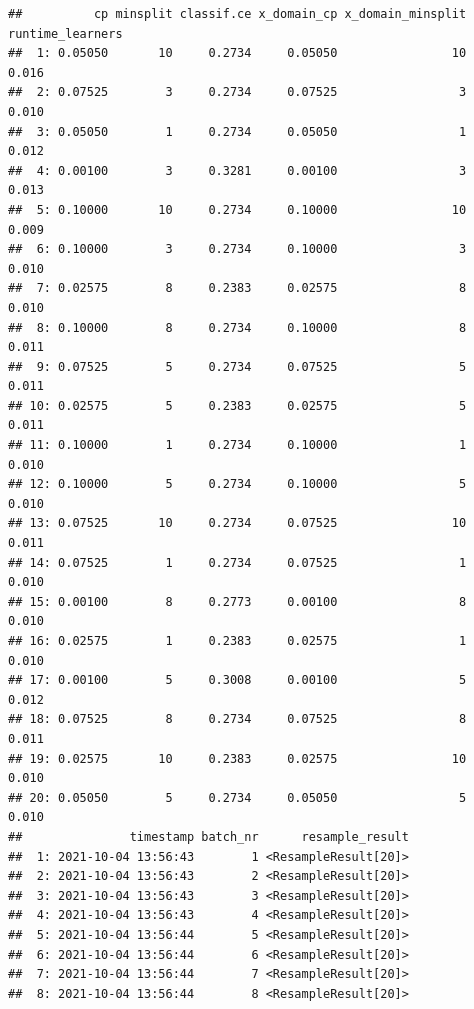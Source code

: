 \documentclass[
]{scrbook}
\newenvironment{Shaded}{\begin{snugshade}}{\end{snugshade}}
\newcommand{\FunctionTok}[1]{\textcolor[rgb]{0.00,0.00,0.00}{#1}}
\newcommand{\NormalTok}[1]{#1}
\newcommand{\SpecialCharTok}[1]{\textcolor[rgb]{0.00,0.00,0.00}{#1}}
\renewenvironment{Shaded} {\begin{snugshade}\small} {\end{snugshade}}
\begin{document}
\begin{Shaded}
\end{Shaded}

\begin{verbatim}
##          cp minsplit classif.ce x_domain_cp x_domain_minsplit runtime_learners
##  1: 0.05050       10     0.2734     0.05050                10            0.016
##  2: 0.07525        3     0.2734     0.07525                 3            0.010
##  3: 0.05050        1     0.2734     0.05050                 1            0.012
##  4: 0.00100        3     0.3281     0.00100                 3            0.013
##  5: 0.10000       10     0.2734     0.10000                10            0.009
##  6: 0.10000        3     0.2734     0.10000                 3            0.010
##  7: 0.02575        8     0.2383     0.02575                 8            0.010
##  8: 0.10000        8     0.2734     0.10000                 8            0.011
##  9: 0.07525        5     0.2734     0.07525                 5            0.011
## 10: 0.02575        5     0.2383     0.02575                 5            0.011
## 11: 0.10000        1     0.2734     0.10000                 1            0.010
## 12: 0.10000        5     0.2734     0.10000                 5            0.010
## 13: 0.07525       10     0.2734     0.07525                10            0.011
## 14: 0.07525        1     0.2734     0.07525                 1            0.010
## 15: 0.00100        8     0.2773     0.00100                 8            0.010
## 16: 0.02575        1     0.2383     0.02575                 1            0.010
## 17: 0.00100        5     0.3008     0.00100                 5            0.012
## 18: 0.07525        8     0.2734     0.07525                 8            0.011
## 19: 0.02575       10     0.2383     0.02575                10            0.010
## 20: 0.05050        5     0.2734     0.05050                 5            0.010
##               timestamp batch_nr      resample_result
##  1: 2021-10-04 13:56:43        1 <ResampleResult[20]>
##  2: 2021-10-04 13:56:43        2 <ResampleResult[20]>
##  3: 2021-10-04 13:56:43        3 <ResampleResult[20]>
##  4: 2021-10-04 13:56:43        4 <ResampleResult[20]>
##  5: 2021-10-04 13:56:44        5 <ResampleResult[20]>
##  6: 2021-10-04 13:56:44        6 <ResampleResult[20]>
##  7: 2021-10-04 13:56:44        7 <ResampleResult[20]>
##  8: 2021-10-04 13:56:44        8 <ResampleResult[20]>

\end{verbatim}
\end{document}
